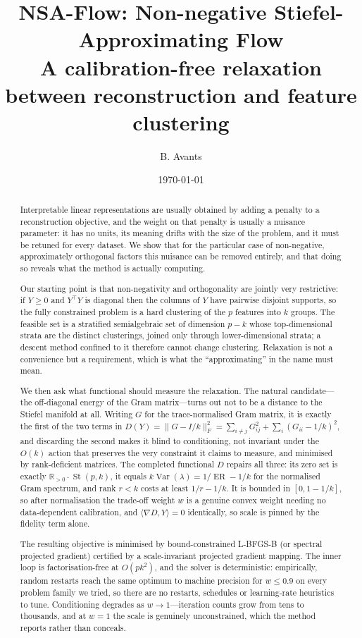 \documentclass[11pt]{article}
\title{\bf NSA-Flow: Non-negative Stiefel-Approximating Flow\\
\large A calibration-free relaxation between reconstruction and
feature clustering}
\author{B. Avants}
\date{\today}
\theoremstyle{definition}
\DeclareMathOperator{\Var}{Var}
\DeclareMathOperator{\st}{St}
\DeclareMathOperator{\ER}{ER}
\newcommand{\R}{\mathbb{R}}
\newcommand{\Rpos}{\R_{>0}}
\newcommand{\Fnorm}[1]{\lVert #1 \rVert_F}
\newcommand{\ip}[2]{\langle #1, #2 \rangle}
\begin{document}
\maketitle

\begin{abstract}
Interpretable linear representations are usually obtained by adding a penalty to
a reconstruction objective, and the weight on that penalty is usually a nuisance
parameter: it has no units, its meaning drifts with the size of the problem, and
it must be retuned for every dataset. We show that for the particular case of
non-negative, approximately orthogonal factors this nuisance can be removed
entirely, and that doing so reveals what the method is actually computing.

Our starting point is that non-negativity and orthogonality are jointly very
restrictive: if $Y \ge 0$ and $Y^\top Y$ is diagonal then the columns of $Y$ have
pairwise disjoint supports, so the fully constrained problem is a hard clustering
of the $p$ features into $k$ groups. The feasible set is a stratified
semialgebraic set of dimension $p-k$ whose top-dimensional strata are the
distinct clusterings, joined only through lower-dimensional strata; a descent
method confined to it therefore cannot change clustering. Relaxation is not a
convenience but a requirement, which is what the ``approximating'' in the name
must mean.

We then ask what functional should measure the relaxation. The natural
candidate---the off-diagonal energy of the Gram matrix---turns out not to be a
distance to the Stiefel manifold at all. Writing $G$ for the trace-normalised
Gram matrix, it is exactly the first of the two terms in
$D(Y) = \Fnorm{G - I/k}^2 = \sum_{i \ne j} G_{ij}^2 + \sum_i (G_{ii} - 1/k)^2$,
and discarding the second makes it blind to conditioning, not invariant under the
$O(k)$ action that preserves the very constraint it claims to measure, and
minimised by rank-deficient matrices. The completed functional $D$ repairs all
three: its zero set is exactly $\Rpos \cdot \st(p,k)$, it equals
$k\Var(\lambda) = 1/\ER - 1/k$ for the normalised Gram spectrum, and rank $r<k$
costs at least $1/r - 1/k$. It is bounded in $[0, 1-1/k]$, so after
normalisation the trade-off weight $w$ is a genuine convex weight needing no
data-dependent calibration, and $\ip{\nabla D}{Y} = 0$ identically, so scale is
pinned by the fidelity term alone.

The resulting objective is minimised by bound-constrained L-BFGS-B (or spectral
projected gradient) certified by a scale-invariant projected gradient mapping.
The inner loop is factorisation-free at $O(pk^2)$, and the solver is deterministic:
empirically, random restarts reach the same optimum to machine precision for
$w \le 0.9$ on every problem family we tried, so there are no restarts,
schedules or learning-rate heuristics to tune. Conditioning degrades as
$w\to1$---iteration counts grow from tens to thousands, and at $w=1$ the scale
is genuinely unconstrained, which the method reports rather than conceals.


\end{abstract}
\end{document}
